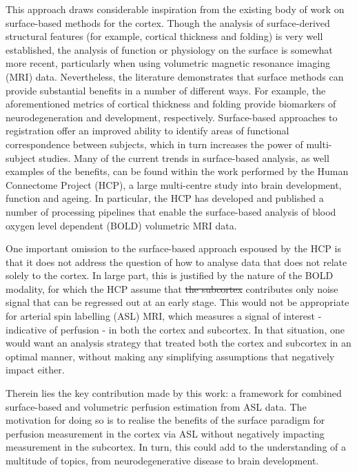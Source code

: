 \documentclass[12pt]{report}
\providecommand{\DIFaddtex}[1]{{\protect\color{blue}\uwave{#1}}} %
\providecommand{\DIFdeltex}[1]{{\protect\color{red}\sout{#1}}}                      %
\providecommand{\DIFaddbegin}{} %
\providecommand{\DIFaddend}{} %
\providecommand{\DIFdelbegin}{} %
\providecommand{\DIFdelend}{} %
\providecommand{\DIFadd}[1]{\texorpdfstring{\DIFaddtex{#1}}{#1}} %
\providecommand{\DIFdel}[1]{\texorpdfstring{\DIFdeltex{#1}}{}} %
\newcommand{\DIFscaledelfig}{0.5}
\newlength{\DIFdelgraphicswidth} %
\newlength{\DIFdelgraphicsheight} %
\newcommand{\DIFaddincludegraphics}[2][]{{\color{blue}\fbox{\DIFOincludegraphics[#1]{#2}}}} %
\newcommand{\DIFdelincludegraphics}[2][]{%
\sbox{\DIFdelgraphicsbox}{\DIFOincludegraphics[#1]{#2}}%
\settoboxwidth{\DIFdelgraphicswidth}{\DIFdelgraphicsbox} %
\settoboxtotalheight{\DIFdelgraphicsheight}{\DIFdelgraphicsbox} %
\scalebox{\DIFscaledelfig}{%
\parbox[b]{\DIFdelgraphicswidth}{\usebox{\DIFdelgraphicsbox}\\[-\baselineskip] \rule{\DIFdelgraphicswidth}{0em}}\llap{\resizebox{\DIFdelgraphicswidth}{\DIFdelgraphicsheight}{%
\setlength{\unitlength}{\DIFdelgraphicswidth}%
\begin{picture}(1,1)%
\thicklines\linethickness{2pt} %
{\color[rgb]{1,0,0}\put(0,0){\framebox(1,1){}}}%
{\color[rgb]{1,0,0}\put(0,0){\line( 1,1){1}}}%
{\color[rgb]{1,0,0}\put(0,1){\line(1,-1){1}}}%
\end{picture}%
}\hspace*{3pt}}} %
} %
\DeclareRobustCommand{\DIFaddbegin}{\DIFOaddbegin \let\includegraphics\DIFaddincludegraphics} %
\DeclareRobustCommand{\DIFaddend}{\DIFOaddend \let\includegraphics\DIFOincludegraphics} %
\DeclareRobustCommand{\DIFdelbegin}{\DIFOdelbegin \let\includegraphics\DIFdelincludegraphics} %
\DeclareRobustCommand{\DIFdelend}{\DIFOaddend \let\includegraphics\DIFOincludegraphics} %
\begin{document}
This approach draws considerable inspiration from the existing body of work on surface-based methods for the cortex. Though the analysis of surface-derived structural features (for example, cortical thickness and folding) is very well established, the analysis of function or physiology on the surface is somewhat more recent, particularly when using volumetric magnetic resonance imaging (MRI) data. Nevertheless, the literature demonstrates that surface methods can provide substantial benefits in a number of different ways. For example, the aforementioned metrics of cortical thickness and folding provide biomarkers of neurodegeneration and development, respectively. Surface-based approaches to registration offer an improved ability to identify areas of functional correspondence between subjects, which in turn increases the power of multi-subject studies. Many of the current trends in surface-based analysis, as well examples of the benefits, can be found within the work performed by the Human Connectome Project (HCP), a large multi-centre study into brain development, function and ageing. In particular, the HCP has developed and published a number of processing pipelines that enable the surface-based analysis of blood oxygen level dependent (BOLD) volumetric MRI data. 

One important omission to the surface-based approach espoused by the HCP is that it does not address the question of how to analyse data that does not relate solely to the cortex. In large part, this is justified by the nature of the BOLD modality, for which the HCP assume that \DIFdelbegin \DIFdel{the subcortex }\DIFdelend \DIFaddbegin \DIFadd{subcortical white matter }\DIFaddend contributes only noise signal that can be regressed out at an early stage. This would not be appropriate for arterial spin labelling (ASL) MRI, which measures a signal of interest - indicative of perfusion - in both the cortex and subcortex. In that situation, one would want an analysis strategy that treated both the cortex and subcortex in an optimal manner, without making any simplifying assumptions that negatively impact either. 

Therein lies the key contribution made by this work: a framework for combined surface-based and volumetric perfusion estimation from ASL data. The motivation for doing so is to realise the benefits of the surface paradigm for perfusion measurement in the cortex via ASL without negatively impacting measurement in the subcortex. In turn, this could add to the understanding of a multitude of topics, from neurodegenerative disease to brain development. 
\end{document}
